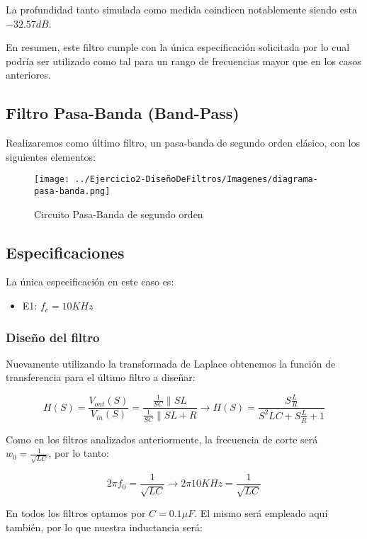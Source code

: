 La profundidad tanto simulada como medida coindicen notablemente siendo esta $-32.57 dB$.

En resumen, este filtro cumple con la única especificación solicitada por lo cual podría ser utilizado como tal para un rango
de frecuencias mayor que en los casos anteriores.

\subsection{Filtro Pasa-Banda (Band-Pass)}

Realizaremos como último filtro, un pasa-banda de segundo orden clásico, con los siguientes elementos:

\begin{figure}[H]
    \centering
    \texttt{[image: ../Ejercicio2-DiseñoDeFiltros/Imagenes/diagrama-pasa-banda.png]}
    \caption{Circuito Pasa-Banda de segundo orden}
\end{figure}

\subsection{Especificaciones}

La única especificación en este caso es:

\begin{itemize}
	\item E1: $f_c=10 KHz$
\end{itemize}

\subsubsection{Diseño del filtro}

Nuevamente utilizando la transformada de Laplace obtenemos la función de transferencia para el último filtro
a diseñar:

$$H(S)=\frac{V_{out}(S)}{V_{in}(S)}=\frac{\frac{1}{SC}\parallel SL}{\frac{1}{SC}\parallel SL + R} \longrightarrow 
H(S)=\frac{S\frac{L}{R}}{S^2LC+S\frac{L}{R}+1}$$

Como en los filtros analizados anteriormente, la frecuencia de corte
será $w_0=\frac{1}{\sqrt{LC}}$, por lo tanto:

$$2 \pi f_0 = \frac{1}{\sqrt{LC}} \longrightarrow 2 \pi 10KHz = \frac{1}{\sqrt{LC}}$$

En todos los filtros optamos por $C=0.1 \mu F$. El mismo será empleado aquí también, por lo que nuestra inductancia será:

